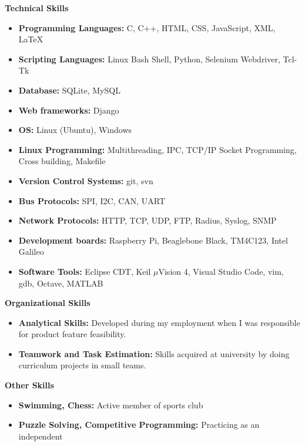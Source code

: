 \documentclass[letterpaper,10pt]{article}
\newcommand{\resheading}[1]{{\large \colorbox{mygrey}{\begin{minipage}{\textwidth}{\textbf{#1 \vphantom{p\^{E}}}}\end{minipage}}}}
\begin{document}
\resheading{Technical Skills}
\begin{itemize}
\item \textbf{Programming Languages:} C, C++, HTML, CSS, JavaScript, XML, LaTeX
\item \textbf{Scripting Languages:} Linux Bash Shell, Python, Selenium Webdriver, Tcl-Tk
\item \textbf{Database:} SQLite, MySQL
\item \textbf{Web frameworks:} Django
\item \textbf{OS:} Linux (Ubuntu), Windows
\item \textbf{Linux Programming:} Multithreading, IPC, TCP/IP Socket Programming, Cross building, Makefile
\item \textbf{Version Control Systems:} git, svn
\item \textbf{Bus Protocols:} SPI, I2C, CAN, UART
\item \textbf{Network Protocols:} HTTP, TCP, UDP, FTP, Radius, Syslog, SNMP
\item \textbf{Development boards:} Raspberry Pi, Beaglebone Black, TM4C123, Intel Galileo
\item \textbf{Software Tools:} Eclipse CDT, Keil $\mu$Vision 4, Visual Studio Code, vim, gdb, Octave, MATLAB

\end{itemize}

\resheading{Organizational Skills}
\begin{itemize}
\item \textbf{Analytical Skills:} Developed during my employment when I was responsible for product feature feasibility.
\item \textbf{Teamwork and Task Estimation:} Skills acquired at university by doing curriculum projects in small teams.

\end{itemize}

\resheading{Other Skills}
    \begin{itemize}
        \item \textbf{Swimming, Chess:} Active member of sports club
        \item \textbf{Puzzle Solving, Competitive Programming:} Practicing as an independent
    \end{itemize}
\end{document}

